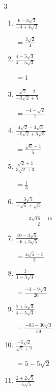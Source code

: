 \begin{multicols}{3}
\begin{enumerate}
        $\displaystyle =\frac{3\sqrt{2}+1}{3}$

  \item $\displaystyle \frac{6-3\sqrt{2}}{-4+4\sqrt{2}}$

        $\displaystyle =\frac{3\sqrt{2}}{4}$

\columnbreak %

  \item $\displaystyle \frac{4-5\sqrt{3}}{4-5\sqrt{3}}$

        $\displaystyle =1$

  \item $\displaystyle \frac{\sqrt{2}-2}{-3\sqrt{2}+5}$

        $\displaystyle =\frac{-4-\sqrt{2}}{7}$

  \item $\displaystyle \frac{4\sqrt{2}-3\sqrt{3}}{-5\sqrt{2}+5\sqrt{3}}$

        $\displaystyle =\frac{\sqrt{6}-1}{5}$

  \item $\displaystyle \frac{\sqrt{2}+1}{3\sqrt{2}+3}$

        $\displaystyle =\frac{1}{3}$

  \item $\displaystyle \frac{3\sqrt{5}}{-\sqrt{5}+\sqrt{3}}$

        $\displaystyle =\frac{-3\sqrt{15}-15}{2}$

\columnbreak %

\resetques

  \item $\displaystyle \frac{10-3\sqrt{5}}{-6+3\sqrt{5}}$

        $\displaystyle =\frac{4\sqrt{5}+5}{3}$

  \item $\displaystyle \frac{3}{1-3\sqrt{3}}$

        $\displaystyle =\frac{-3-9\sqrt{3}}{26}$

  \item $\displaystyle \frac{2+5\sqrt{3}}{4-5\sqrt{3}}$

        $\displaystyle =\frac{-83-30\sqrt{3}}{59}$

  \item $\displaystyle \frac{-5\sqrt{2}}{\sqrt{2}+2}$

        $\displaystyle =5-5\sqrt{2}$

  \item $\displaystyle \frac{2+2\sqrt{5}}{-5\sqrt{5}}$


\end{enumerate}
\end{multicols}
